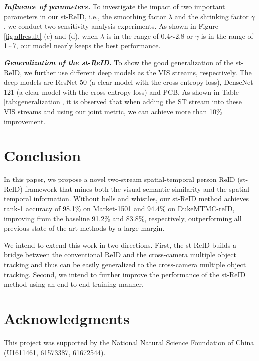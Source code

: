\documentclass[letterpaper]{article} %
\begin{document}
\textbf{\emph{Influence of parameters.}} To investigate the impact of two important parameters in our st-ReID, i.e., the smoothing factor ${\lambda}$ and the shrinking factor ${\gamma}$, we conduct two sensitivity analysis experiments. As shown in Figure \ref{fig:allresult} (c) and (d), when ${\lambda}$ is in the range of 0.4$\sim$2.8 or ${\gamma}$ is in the range of 1$\sim$7, our model nearly keeps the best performance.

\textbf{\emph{Generalization of the st-ReID.}} To show the good generalization of the st-ReID, we further use different deep models as the VIS streams, respectively. The deep models are ResNet-50 (a clear model with the cross entropy loss), DenseNet-121 (a clear model with the cross entropy loss) and PCB. As shown in Table \ref{tab:generalization}, it is observed that when adding the ST stream into these VIS streams and using our joint metric, we can achieve more than 10\% improvement.

\section{Conclusion}
\label{sec:con}
In this paper, we propose a novel two-stream spatial-temporal person ReID (st-ReID) framework that mines both the visual semantic similarity and the spatial-temporal information. Without bells and whistles, our st-ReID method achieves rank-1 accuracy of 98.1\% on Market-1501 and 94.4\% on  DukeMTMC-reID, improving from the baseline 91.2\% and 83.8\%, respectively, outperforming all previous state-of-the-art methods by a large margin.

We intend to extend this work in two directions. First, the st-ReID builds a bridge between the conventional ReID and the cross-camera multiple object tracking and thus can be easily generalized to the cross-camera multiple object tracking. Second, we intend to further improve the performance of the st-ReID method using an end-to-end training manner.

\section{Acknowledgments}
This project was supported by the National Natural Science Foundation of China (U1611461, 61573387, 61672544).
\end{document}
